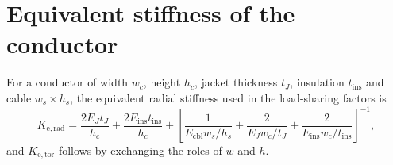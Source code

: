 \appendix
\section{Equivalent stiffness of the conductor}
\label{app:stiffness}
For a conductor of width $w_c$, height $h_c$, jacket thickness $t_J$,
insulation $t_\mathrm{ins}$ and cable $w_s\times h_s$, the equivalent
radial stiffness used in the load-sharing factors is
\begin{equation}
K_\mathrm{e,rad}=\frac{2E_J t_J}{h_c}+\frac{2E_\mathrm{ins}t_\mathrm{ins}}{h_c}
+\left[\frac{1}{E_\mathrm{cbl}w_s/h_s}+\frac{2}{E_J w_c/t_J}
+\frac{2}{E_\mathrm{ins}w_c/t_\mathrm{ins}}\right]^{-1},
\end{equation}
and $K_\mathrm{e,tor}$ follows by exchanging the roles of $w$ and $h$.
